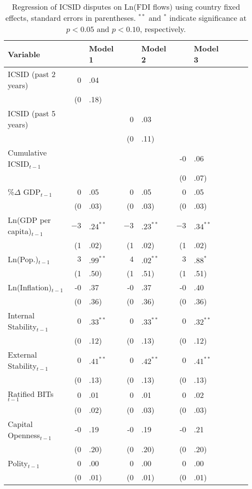 \documentclass[12pt,onesided]{amsart}
\begin{document}
\begin{table}[ht]
\centering
\caption{Regression of ICSID disputes on Ln(FDI flows) using country fixed effects, standard errors in parentheses. $^{**}$ and $^{*}$ indicate significance at $p< 0.05 $ and $p< 0.10 $, respectively.} 
\label{tab:dispFDI}
{\footnotesize
\begin{tabular}{lr@{} lr@{}lr@{}lr@{}lr@{}}
 Variable && Model 1 && Model 2 && Model 3 \\ 
  \hline
\hline
ICSID  (past 2 years) & 0&.04 &&  &&  \\ 
   & (0&.18) &&  &&  \\ 
  ICSID  (past 5 years) &&  & 0&.03 &&  \\ 
   &&  & (0&.11) &&  \\ 
  Cumulative ICSID$_{t-1}$ &&  &&  & -0&.06 \\ 
   &&  &&  & (0&.07) \\ 
  \%$\Delta$ GDP$_{t-1}$ & 0&.05 & 0&.05 & 0&.05 \\ 
   & (0&.03) & (0&.03) & (0&.03) \\ 
  Ln(GDP per capita)$_{t-1}$ & $-3$&$.24^{\ast\ast}$ & $-3$&$.23^{\ast\ast}$ & $-3$&$.34^{\ast\ast}$ \\ 
   & (1&.02) & (1&.02) & (1&.02) \\ 
  Ln(Pop.)$_{t-1}$ & $3$&$.99^{\ast\ast}$ & $4$&$.02^{\ast\ast}$ & $3$&$.88^{\ast}$ \\ 
   & (1&.50) & (1&.51) & (1&.51) \\ 
  Ln(Inflation)$_{t-1}$ & -0&.37 & -0&.37 & -0&.40 \\ 
   & (0&.36) & (0&.36) & (0&.36) \\ 
  Internal Stability$_{t-1}$ & $0$&$.33^{\ast\ast}$ & $0$&$.33^{\ast\ast}$ & $0$&$.32^{\ast\ast}$ \\ 
   & (0&.12) & (0&.13) & (0&.12) \\ 
  External Stability$_{t-1}$ & $0$&$.41^{\ast\ast}$ & $0$&$.42^{\ast\ast}$ & $0$&$.41^{\ast\ast}$ \\ 
   & (0&.13) & (0&.13) & (0&.13) \\ 
  Ratified BITs$_{t-1}$ & 0&.01 & 0&.01 & 0&.02 \\ 
   & (0&.02) & (0&.03) & (0&.03) \\ 
  Capital Openness$_{t-1}$ & -0&.19 & -0&.19 & -0&.21 \\ 
   & (0&.20) & (0&.20) & (0&.20) \\ 
  Polity$_{t-1}$ & 0&.00 & 0&.00 & 0&.00 \\ 
   & (0&.01) & (0&.01) & (0&.01) \\ 

\end{tabular}}
\end{table}
\end{document}

